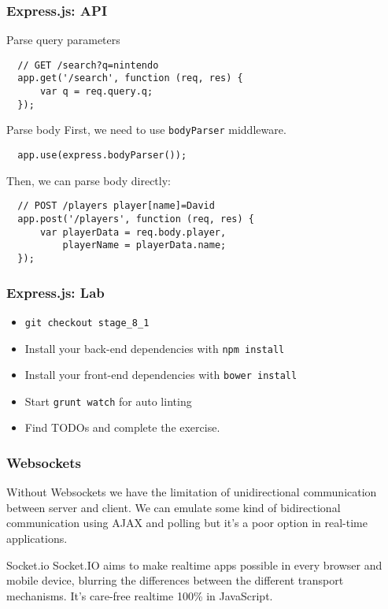\begin{frame}[fragile]
  \frametitle{Express.js: API}

  \begin{block}{Parse query parameters}
  {\tiny
  \begin{verbatim}
  // GET /search?q=nintendo
  app.get('/search', function (req, res) {
      var q = req.query.q;
  });
  \end{verbatim}
  }
  \end{block}

  \pause

  \begin{block}{Parse body}
  First, we need to use \texttt{bodyParser} middleware.
  {\tiny
  \begin{verbatim}
  app.use(express.bodyParser());
  \end{verbatim}
  }
  Then, we can parse body directly:
  {\tiny
  \begin{verbatim}
  // POST /players player[name]=David
  app.post('/players', function (req, res) {
      var playerData = req.body.player,
          playerName = playerData.name;
  });
  \end{verbatim}
  }

  \end{block}
\end{frame}

\begin{frame}[fragile]
  \frametitle{Express.js: Lab}

  \begin{itemize}
    \item \texttt{git checkout stage\_8\_1}
    \item Install your back-end dependencies with \texttt{npm install}
    \item Install your front-end dependencies with \texttt{bower install}
    \item Start \texttt{grunt watch} for auto linting
    \item Find TODOs and complete the exercise.
  \end{itemize}
\end{frame}

\begin{frame}[fragile]
  \frametitle{Websockets}

  Without Websockets we have the limitation of unidirectional communication between server and client. We can emulate some kind of bidirectional communication using AJAX and polling but it's a poor option in real-time applications.

  \pause

  \begin{block}{Socket.io}
    Socket.IO aims to make realtime apps possible in every browser and mobile device, blurring the differences between the different transport mechanisms. It's care-free realtime 100\% in JavaScript.
  \end{block}
\end{frame}
    
